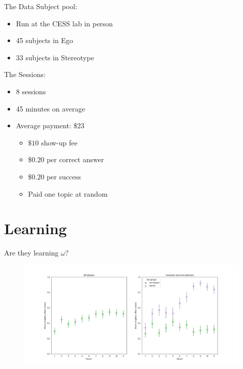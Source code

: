 \documentclass[aspectratio=169]{beamer}
\begin{document}
\begin{frame}{The Data}
    Subject pool:\\
    \begin{itemize}
        \item Run at the CESS lab in person
        \item 45 subjects in Ego
        \item 33 subjects in Stereotype
    \end{itemize}
    \bigskip
    The Sessions:
    \begin{itemize}
        \item 8 sessions 
        \item 45 minutes on average
        \item Average payment: $\$23$
        \begin{itemize}
            \item $\$10$ show-up fee
            \item $\$ 0.20$ per correct answer
            \item $\$ 0.20$ per success
            \item Paid one topic at random
        \end{itemize}
    \end{itemize}
    
\end{frame}

\section*{Learning}

\begin{frame}{Are they learning $\omega$?}
    \begin{figure}
        \centering
        \includegraphics[scale=.3]{learning_groups.png}
    \end{figure}

\end{frame}
\end{document}
